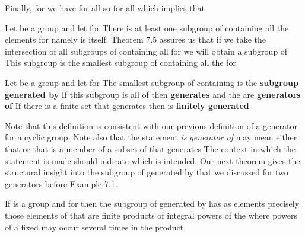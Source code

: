 \documentclass[11pt,oneside]{article}
\begin{document}
\begin{BookBody}
Finally, for  we have  for all  so  for all  which implies that \BookEnd{\blacklozenge}

Let  be a group and let  for  There is at least one subgroup of  containing all the elements  for  namely  is itself. Theorem 7.5 assures us that if we take the intersection of all subgroups of  containing all  for  we will obtain a subgroup  of  This subgroup  is the smallest subgroup of  containing all the  for 

 Let  be a group and let  for  The smallest subgroup of  containing   is the\textbf{ subgroup generated by}  If this subgroup is all of  then   \textbf{generates}  and the  are\textbf{ generators of}  If there is a finite set  that generates  then  is\textbf{ finitely generated}\BookEnd{\blacksquare}

Note that this definition is consistent with our previous definition of a generator for a cyclic group. Note also that the statement  \textit{is}  \textit{generator of}  may mean either that  or that  is a member of a subset of  that generates  The context in which the statement is made should indicate which is intended. Our next theorem gives the structural insight into the subgroup of  generated by  that we discussed for two generators before Example 7.1.

 If  is a group and  for  then the subgroup  of  generated by   has as elements precisely those elements of  that are finite products of integral powers of the  where powers of a fixed  may occur several times in the product.


\end{BookBody}
\end{document}
